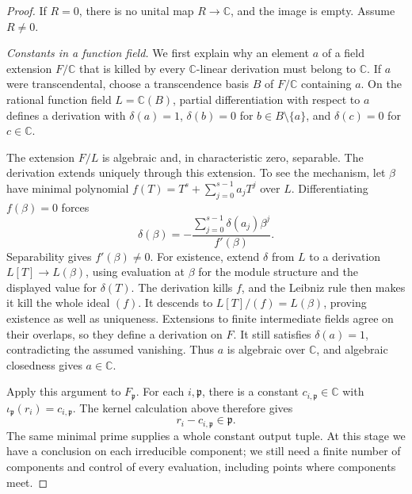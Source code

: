 \documentclass[aps,prl,reprint,notitlepage,nofootinbib,nobibnotes]{revtex4-2}
\begin{document}
\begin{proof}
If \(R=0\), there is no unital map \(R\to\mathbb C\), and the image
is empty. Assume \(R\ne0\).

\emph{Constants in a function field.}
We first explain why an element \(a\) of a field extension
\(F/\mathbb C\) that is killed by every \(\mathbb C\)-linear
derivation must belong to \(\mathbb C\).
If \(a\) were transcendental, choose a transcendence basis \(B\) of
\(F/\mathbb C\) containing \(a\). On the rational function field
\(L=\mathbb C(B)\), partial differentiation with respect to \(a\)
defines a derivation with \(\delta(a)=1\), \(\delta(b)=0\) for
\(b\in B\setminus\{a\}\), and \(\delta(c)=0\) for \(c\in\mathbb C\).

The extension \(F/L\) is algebraic and, in characteristic zero,
separable. The derivation extends uniquely through this extension.
To see the mechanism, let \(\beta\) have minimal polynomial
\(f(T)=T^s+\sum_{j=0}^{s-1}a_jT^j\) over \(L\). Differentiating
\(f(\beta)=0\) forces
\[
 \delta(\beta)=-
 \frac{\sum_{j=0}^{s-1}\delta(a_j)\beta^j}{f'(\beta)}.
\]
Separability gives \(f'(\beta)\ne0\). For existence, extend
\(\delta\) from \(L\) to a derivation \(L[T]\to L(\beta)\), using
evaluation at \(\beta\) for the module structure and the displayed
value for \(\delta(T)\). The derivation kills \(f\), and the Leibniz
rule then makes it kill the whole ideal \((f)\). It descends to
\(L[T]/(f)=L(\beta)\), proving existence as well as uniqueness.
Extensions to finite intermediate fields agree on their overlaps,
so they define a derivation on \(F\). It still satisfies
\(\delta(a)=1\), contradicting the assumed vanishing.
Thus \(a\) is algebraic over \(\mathbb C\), and algebraic closedness
gives \(a\in\mathbb C\).

Apply this argument to \(F_{\mathfrak p}\). For each \(i,\mathfrak p\),
there is a constant \(c_{i,\mathfrak p}\in\mathbb C\) with
\(\iota_{\mathfrak p}(r_i)=c_{i,\mathfrak p}\).
The kernel calculation above therefore gives
\begin{equation}\label{eq:component-constants}
 r_i-c_{i,\mathfrak p}\in\mathfrak p.
\end{equation}
The same minimal prime supplies a whole constant output tuple.
At this stage we have a conclusion on each irreducible component;
we still need a finite number of components and control of every
evaluation, including points where components meet.


\end{proof}
\end{document}
